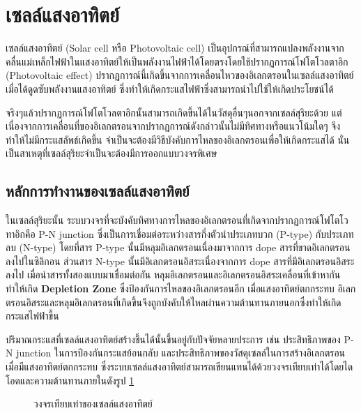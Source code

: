 \documentclass[11pt]{article}
\begin{document}
\section{เซลล์แสงอาทิตย์}
\label{sec:org53927b1}

เซลล์แสงอาทิตย์ (Solar cell หรือ Photovoltaic cell) เป็นอุปกรณ์ที่สามารถแปลงพลังงานจากคลื่นแม่เหล็กไฟฟ้าในแสงอาทิตย์ให้เป็นพลังงานไฟฟ้าได้โดยตรงโดยใช้ปรากฏการณ์โฟโตโวลตาอิก (Photovoltaic effect) ปรากฏการณ์นี้เกิดขึ้นจากการเคลื่อนไหวของอิเลกตรอนในเซลล์แสงอาทิตย์เมื่อได้ดูดซับพลังงานแสงอาทิตย์ ซึ่งทำให้เกิดกระแสไฟฟ้าซึ่งสามารถนำไปใช้ให้เกิดประโยชน์ได้

จริงๆแล้วปรากฏการณ์โฟโตโวลตาอิกนั้นสามารถเกิดขึ้นได้ในวัสดุอื่นๆนอกจากเซลล์สุริยะด้วย แต่เนื่องจากการเคลื่อนที่ของอิเลกตรอนจากปรากฏการณ์ดังกล่าวนั้นไม่มีทิศทางหรือแนวโน้มใดๆ จึงทำให้ไม่มีกระแสลัพธ์เกิดขึ้น จำเป็นจะต้องมีวิธีบังคับการไหลของอิเลกตรอนเพื่อให้เกิดกระแสได้ นั่นเป็นสาเหตุที่เซลล์สุริยะจำเป็นจะต้องมีการออกแบบวงจรพิเศษ

\subsection{หลักการทำงานของเซลล์แสงอาทิตย์}
\label{sec:org67c9a44}

ในเซลล์สุริยะนั้น ระบบวงจรที่จะบังคับทิศทางการไหลของอิเลกตรอนที่เกิดจากปรากฏการณ์โฟโตโวทาอิกคือ P-N junction ซึ่งเป็นการเชื่อมต่อระหว่างสารกึ่งตัวนำประเภทบวก (P-type) กับประเภทลบ (N-type) โดยที่สาร P-type นั้นมีหลุมอิเลกตรอนเนื่องมาจากการ dope สารที่ขาดอิเลกตรอนลงไปในซิลิกอน ส่วนสาร N-type นั้นมีอิเลกตรอนอิสระเนื่องจากการ dope สารที่มีอิเลกตรอนอิสระลงไป เมื่อนำสารทั้งสองแบบมาเชื่อมต่อกัน หลุมอิเลกตรอนและอิเลกตรอนอิสระเคลื่อนที่เข้าหากันทำให้เกิด \textbf{Depletion Zone} ซึ่งป้องกันการไหลของอิเลกตรอนอีก เมื่อแสงอาทิตย์ตกกระทบ อิเลกตรอนอิสระและหลุมอิเลกตรอนที่เกิดขึ้นจึงถูกบังคับให้ไหลผ่านความต้านทานภายนอกซึ่งทำให้เกิดกระแสไฟฟ้าขึ้น

ปริมาณกระแสที่เซลล์แสงอาทิตย์สร้างขึ้นได้นั้นขึ้นอยู่กับปัจจัยหลายประการ เช่น ประสิทธิภาพของ P-N junction ในการป้องกันกระแสย้อนกลับ และประสิทธิภาพของวัสดุเซลล์ในการสร้างอิเลกตรอนเมื่อมีแสงอาทิตย์ตกกระทบ ซึ่งระบบเซลล์แสงอาทิตย์สามารถเขียนแทนได้ด้วยวงจรเทียบเท่าได้โดยไดโอดและความต้านทานภายในดังรูป \ref{fig: equiv circuit solar cell}

\begin{figure}[h]
  \centering
  \caption{วงจรเทียบเท่าของเซลล์แสงอาทิตย์}
  \label{fig: equiv circuit solar cell}
\end{figure}
\end{document}
